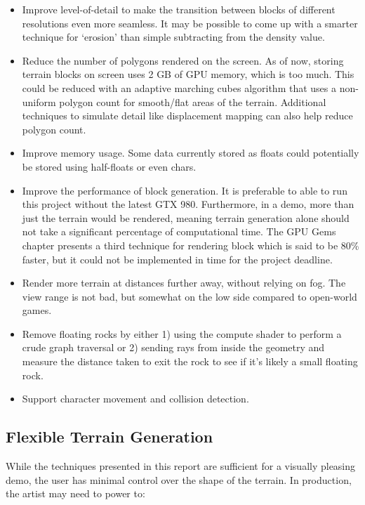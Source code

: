 \documentclass {article}
\begin{document}
\begin{itemize}
\item Improve level-of-detail to make the transition between blocks of different resolutions even more seamless. It may be possible to come up with a smarter technique for `erosion' than simple subtracting from the density value.
\item Reduce the number of polygons rendered on the screen. As of now, storing terrain blocks on screen uses 2 GB of GPU memory, which is too much. This could be reduced with an adaptive marching cubes algorithm that uses a non-uniform polygon count for smooth/flat areas of the terrain. Additional techniques to simulate detail like displacement mapping \cite{Pharr:2005:GGP:1062395} can also help reduce polygon count.
\item Improve memory usage. Some data currently stored as floats could potentially be stored using half-floats or even chars.
\item Improve the performance of block generation. It is preferable to able to run this project without the latest GTX 980. Furthermore, in a demo, more than just the terrain would be rendered, meaning terrain generation alone should not take a significant percentage of computational time. The GPU Gems chapter presents a third technique for rendering block which is said to be 80\% faster, but it could not be implemented in time for the project deadline.
\item Render more terrain at distances further away, without relying on fog. The view range is not bad, but somewhat on the low side compared to open-world games.
\item Remove floating rocks by either 1) using the compute shader to perform a crude graph traversal or 2) sending rays from inside the geometry and measure the distance taken to exit the rock to see if it's likely a small floating rock.
\item Support character movement and collision detection.
\end{itemize}

\subsection{Flexible Terrain Generation}

While the techniques presented in this report are sufficient for a visually pleasing demo, the user has minimal control over the shape of the terrain. In production, the artist may need to power to:
\end{document}
